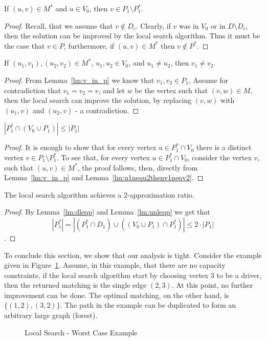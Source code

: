 \begin{lemma}
\label{lm:v_in_p}
If $(u, v) \in M^*$ and $u \in V_0$, then $v \in P_1 \setminus P^*_1$.
\end{lemma}

\begin{proof}
Recall, that we assume that $v \notin D_c$.
Clearly, if $v$ was in $V_0$ or in $D \setminus D_c$, 
then the solution can be improved by the local search algorithm.
Thus it must be the case that $v \in P$, furthermore, 
if $(u, v) \in M^*$ then $v \notin P^*$. 
\end{proof}

\begin{lemma}
\label{lm:u1nequ2thenv1neqv2}
If $(u_1, v_1), (u_2, v_2) \in M^*$,
$u_1, u_2 \in V_0$, 
and $u_1 \neq u_2$,
then $v_1 \neq v_2$.
\end{lemma}

\begin{proof}
From Lemma~\ref{lm:v_in_p} we know that $v_1, v_2 \in P_1$,
Assume for contradiction that $v_1 = v_2 = v$,
and let $w$ be the vertex such that $(v, w) \in M$,
then the local search can improve the solution, 
by replacing $(v, w)$ with $(u_1, v)$ and $(u_2, v)$ - a contradiction.
\end{proof}

\begin{lemma}
\label{lm:unleqp}
$|P^*_1 \cap (V_0 \cup P_1)| \leq |P_1|$
\end{lemma}

\begin{proof}
It is enough to show that for every vertex $u \in P^*_1 \cap V_0$
there is a distinct vertex $v \in P_1 \setminus P^*_1$.
To see that, for every vertex $u \in P^*_1 \cap V_0$, 
consider the vertex $v$, such that $(u, v) \in M^*$, 
the proof follows, then, directly
from Lemma~\ref{lm:v_in_p} and Lemma~\ref{lm:u1nequ2thenv1neqv2}.  
\end{proof}


\begin{theorem}
The local search algorithm achieves a 2-approximation ratio.
\end{theorem}

\begin{proof}
By Lemma~\ref{lm:dleqp} and Lemma~\ref{lm:unleqp} we get that 
$$
|P^*_1| = 
|(P^*_1 \cap D_1) \cup ((V_0 \cup P_1) \cap P^*_1)| \leq 2 \cdot |P_1|
$$.
\end{proof}

To conclude this section, we show that our analysis is tight.
Consider the example given in Figure~\ref{fig:localtight}.
Assume, in this example, that there are no capacity constraints,
if the local search algorithm start by choosing vertex $3$ to be a driver, 
then the returned matching is the single edge $(2,3)$.
At this point, no further improvement can be done.
The optimal matching, on the other hand, is $\{(1, 2), (3, 2)\}$. 
The path in the example can be duplicated to form an arbitrary large graph (forest).

\begin{figure} 

\caption{
\label{fig:localtight}
Local Search - Worst Case Example
}
\end{figure}